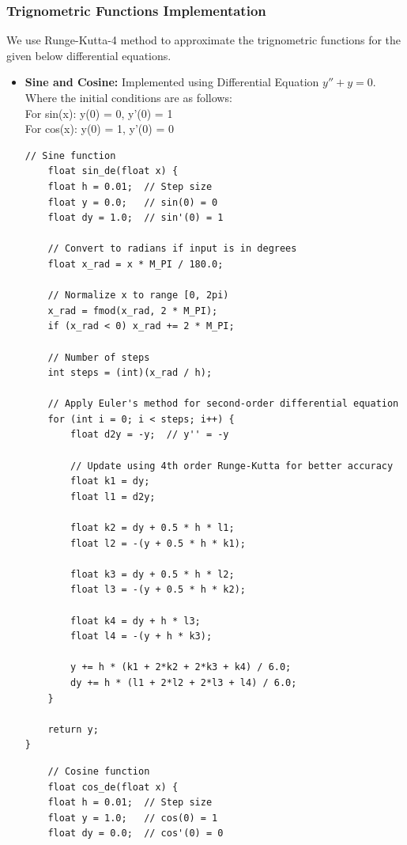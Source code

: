 \documentclass[12pt]{article}
\begin{document}
\subsubsection{Trignometric Functions Implementation}
We use Runge-Kutta-4 method to approximate the trignometric functions for the given below differential equations.

\begin{itemize}
    \item \textbf{Sine and Cosine:} Implemented using Differential Equation $y'' + y = 0$.\\
    Where the initial conditions are as follows:\\
    For sin(x): y(0) = 0, y'(0) = 1\\
    For cos(x): y(0) = 1, y'(0) = 0
    \begin{lstlisting}[caption={Sine and Cosine functions implementation using Differential Equation}]
    // Sine function
    float sin_de(float x) {
    float h = 0.01;  // Step size
    float y = 0.0;   // sin(0) = 0
    float dy = 1.0;  // sin'(0) = 1
    
    // Convert to radians if input is in degrees
    float x_rad = x * M_PI / 180.0;
    
    // Normalize x to range [0, 2pi)
    x_rad = fmod(x_rad, 2 * M_PI);
    if (x_rad < 0) x_rad += 2 * M_PI;
    
    // Number of steps
    int steps = (int)(x_rad / h);
    
    // Apply Euler's method for second-order differential equation
    for (int i = 0; i < steps; i++) {
        float d2y = -y;  // y'' = -y
        
        // Update using 4th order Runge-Kutta for better accuracy
        float k1 = dy;
        float l1 = d2y;
        
        float k2 = dy + 0.5 * h * l1;
        float l2 = -(y + 0.5 * h * k1);
        
        float k3 = dy + 0.5 * h * l2;
        float l3 = -(y + 0.5 * h * k2);
        
        float k4 = dy + h * l3;
        float l4 = -(y + h * k3);
        
        y += h * (k1 + 2*k2 + 2*k3 + k4) / 6.0;
        dy += h * (l1 + 2*l2 + 2*l3 + l4) / 6.0;
    }
    
    return y;
}
\end{lstlisting}

\begin{lstlisting}
    // Cosine function
    float cos_de(float x) {
    float h = 0.01;  // Step size
    float y = 1.0;   // cos(0) = 1
    float dy = 0.0;  // cos'(0) = 0
    

\end{lstlisting}
\end{itemize}
\end{document}

